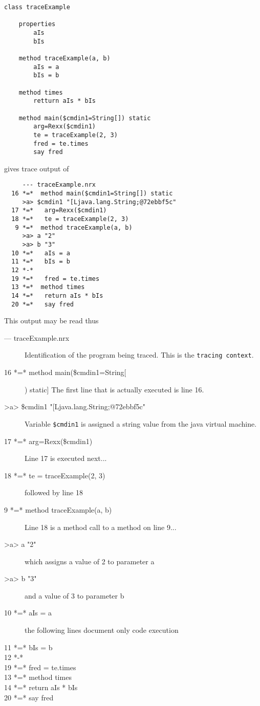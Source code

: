 {\begin{lstlisting}[label=Trace1, caption=Trace Example 1]
class traceExample   

	properties
		aIs
		bIs
	
	method traceExample(a, b)
		aIs = a
		bIs = b
		
	method times
		retturn aIs * bIs

	method main($cmdin1=String[]) static
		arg=Rexx($cmdin1)
		te = traceExample(2, 3)
		fred = te.times
		say fred
\end{lstlisting}
gives trace output of
\begin{verbatim}
     --- traceExample.nrx 
  16 *=*  method main($cmdin1=String[]) static
     >a> $cmdin1 "[Ljava.lang.String;@72ebbf5c" 
  17 *=*   arg=Rexx($cmdin1)
  18 *=*   te = traceExample(2, 3)
   9 *=*  method traceExample(a, b)
     >a> a "2" 
     >a> b "3" 
  10 *=*   aIs = a
  11 *=*   bIs = b
  12 *-* 
  19 *=*   fred = te.times
  13 *=*  method times
  14 *=*   return aIs * bIs
  20 *=*   say fred
\end{verbatim}
This output may be read thus
\begin{description}
\item[\hphantom{111}--- traceExample.nrx] Identification of the program being traced. This is the \texttt{tracing context}.
\item[16 *=*  method main(\$cmdin1=String[]) static] The first line that is actually executed is line 16.
\item[\hphantom{111}>a> \$cmdin1 "[Ljava.lang.String;@72ebbf5c"] Variable \texttt{\$cmdin1} is assigned a string value from the java virtual machine.
\item[17 *=*   arg=Rexx(\$cmdin1)]Line 17 is executed next...
\item[18 *=*   te = traceExample(2, 3)] followed by line 18
\item[\hphantom{1}9 *=*  method traceExample(a, b)] Line 18 is a method call to a method on line 9...
\item[\hphantom{111}>a> a "2"] which assigns a value of 2 to parameter a
\item[\hphantom{111}>a> b "3"] and a value of 3 to parameter b
\item[10 *=*   aIs = a] the following lines document only code execution
\item[11 *=*   bIs = b] 
\item[12 *-*] 
\item[19 *=*   fred = te.times]
\item[13 *=*  method times]
\item[14 *=*   return aIs * bIs]
\item[20 *=*   say fred]
\end{description}

}
